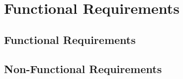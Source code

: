 \section{Functional Requirements}
\subsection{Functional Requirements}
\subsection{Non-Functional Requirements}